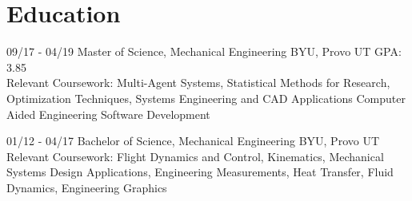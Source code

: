 \documentclass[]{friggeri-cv}
\begin{document}
\section{Education}
\vspace{-3mm}
\begin{entrylist}
    \entry
    {09/17 - 04/19}
    {Master of Science, Mechanical Engineering}
    {BYU, Provo UT}
    {GPA: 3.85\\Relevant Coursework: Multi-Agent Systems, Statistical Methods for Research, Optimization Techniques, Systems Engineering and CAD Applications Computer Aided Engineering Software Development}

    \entry
    {01/12 - 04/17}
    {Bachelor of Science, Mechanical Engineering}
    {BYU, Provo UT}
    {Relevant Coursework: Flight Dynamics and Control, Kinematics, Mechanical Systems Design Applications, Engineering Measurements, Heat Transfer, Fluid Dynamics, Engineering Graphics}



\end{entrylist}



\vspace{-4mm}
\end{document}
